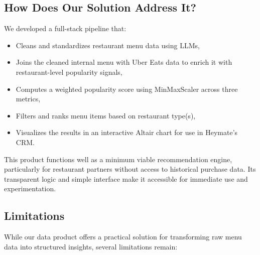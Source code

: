 \documentclass[
  11pt,
  a4paper,
  DIV=11,
  numbers=noendperiod]{scrartcl}
\providecommand{\tightlist}{%
  \setlength{\itemsep}{0pt}\setlength{\parskip}{0pt}}\usepackage{longtable,booktabs,array}
\begin{document}
\subsection{How Does Our Solution Address
It?}\label{how-does-our-solution-address-it}

We developed a full-stack pipeline that:

\begin{itemize}
\tightlist
\item
  Cleans and standardizes restaurant menu data using LLMs,
\item
  Joins the cleaned internal menu with Uber Eats data to enrich it with
  restaurant-level popularity signals,
\item
  Computes a weighted popularity score using MinMaxScaler across three
  metrics,
\item
  Filters and ranks menu items based on restaurant type(s),
\item
  Visualizes the results in an interactive Altair chart for use in
  Heymate's CRM.
\end{itemize}

This product functions well as a minimum viable recommendation engine,
particularly for restaurant partners without access to historical
purchase data. Its transparent logic and simple interface make it
accessible for immediate use and experimentation.

\subsection{Limitations}\label{limitations-1}

While our data product offers a practical solution for transforming raw
menu data into structured insights, several limitations remain:
\end{document}
